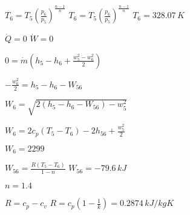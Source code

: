 \( T_6 = T_5 \left( \frac{p_6}{p_5} \right)^{\frac{n-1}{n}} \)  
\( T_6 = T_5 \left( \frac{p_6}{p_5} \right)^{\frac{n-1}{n}} \)  
\( T_6 = 328.07 \, K \)  

\( \dot{Q} = 0 \)  
\( \dot{W} = 0 \)  

\( 0 = \dot{m} \left( h_5 - h_6 + \frac{w_5^2 - w_6^2}{2} \right) \)  

\( -\frac{w_6^2}{2} = h_5 - h_6 - W_{56} \)  

\( W_6 = \sqrt{2 \left( h_5 - h_6 - W_{56} \right) - w_5^2} \)  

\( W_6 = 2 c_p (T_5 - T_6) - 2 h_{56} + \frac{w_5^2}{2} \)  

\( W_6 = 2299 \)  

\( W_{56} = \frac{R (T_5 - T_6)}{1 - n} \)  
\( W_{56} = -79.6 \, kJ \)  

\( n = 1.4 \)  

\( R = c_p - c_v \)  
\( R = c_p \left( 1 - \frac{1}{k} \right) = 0.2874 \, kJ/kgK \)